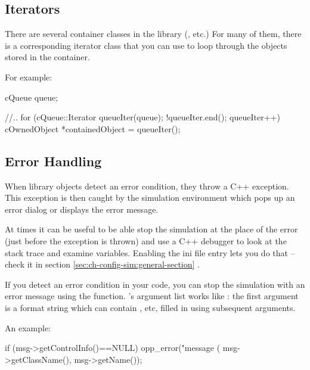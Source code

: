 \subsection{Iterators}


There are several container classes in the library (,
 etc.) For many of them, there is a corresponding
iterator class that you can use to loop through the objects stored in
the container.

For example:

\begin{cpp}
cQueue queue;

//..
for (cQueue::Iterator queueIter(queue); !queueIter.end(); queueIter++)
{
    cOwnedObject *containedObject = queueIter();
}
\end{cpp}



\subsection{Error Handling}


When library objects detect an error condition, they throw a C++ exception.
This exception is then caught by the simulation environment which pops up
an error dialog or displays the error message.

At times it can be useful to be able stop the simulation at the place of the error
(just before the exception is thrown) and use a C++ debugger to look
at the stack trace and examine variables. Enabling the 
ini file entry lets you do that -- check it in section
\ref{sec:ch-config-sim:general-section}  .

If you detect an error condition in your code, you can stop the
simulation with an error message using the  function.
's argument list works like : the
first argument is a format string which can contain ,  etc,
filled in using subsequent arguments.

An example:

\begin{cpp}
if (msg->getControlInfo()==NULL)
    opp_error("message (%
              msg->getClassName(), msg->getName());
\end{cpp}



